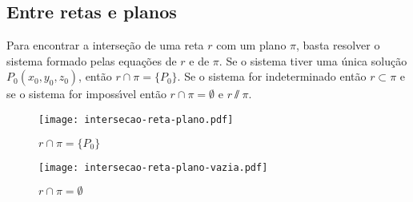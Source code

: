 
\subsection{Entre retas e planos} %
\label{sub:entre_retas_e_planos}

Para encontrar a interse\c{c}\~ao de uma reta $r$ com um plano $\pi$, basta resolver o sistema formado pelas equa\c{c}\~oes de $r$ e de $\pi$. Se o sistema tiver uma \'unica solu\c{c}\~ao $P_0(x_0, y_0, z_0)$, ent\~ao $r \cap \pi = \{P_0\}$. Se o sistema for indeterminado ent\~ao $r\subset \pi$ e se o sistema for imposs{\'\i}vel ent\~ao $r\cap\pi = \emptyset$ e $r \varparallel \pi$.
\begin{figure}[h]
    \centering
    \caption{$r\cap\pi = \{P_0\}$}
    \texttt{[image: intersecao-reta-plano.pdf]}
\end{figure}

\begin{figure}[h]
    \centering
    \caption{$r\cap\pi= \emptyset$}
    \texttt{[image: intersecao-reta-plano-vazia.pdf]}
\end{figure}

